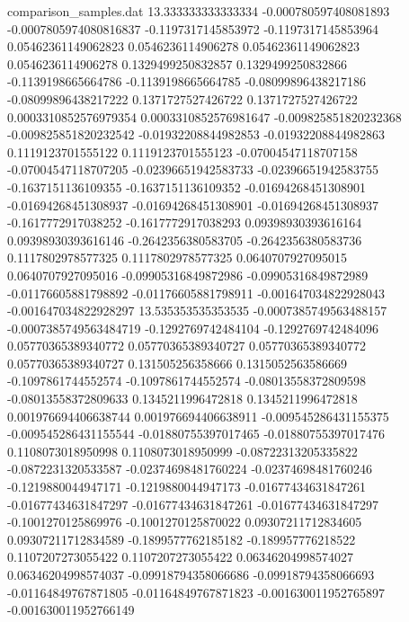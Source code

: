 \begin{filecontents}{comparison_samples.dat}
13.333333333333334  -0.000780597408081893   -0.0007805974080816837  -0.1197317145853972    -0.1197317145853964    0.05462361149062823    0.0546236114906278     0.05462361149062823    0.0546236114906278     0.1329499250832857     0.1329499250832866     -0.1139198665664786     -0.1139198665664785     -0.08099896438217186   -0.08099896438217222   0.1371727527426722      0.1371727527426722      0.0003310852576979354   0.0003310852576981647   -0.009825851820232368   -0.009825851820232542   -0.01932208844982853    -0.01932208844982863    0.1119123701555122      0.1119123701555123      -0.07004547118707158    -0.07004547118707205    -0.02396651942583733   -0.02396651942583755   -0.1637151136109355    -0.1637151136109352    -0.01694268451308901    -0.01694268451308937    -0.01694268451308901    -0.01694268451308937    -0.1617772917038252    -0.1617772917038293    0.09398930393616164     0.09398930393616146     -0.2642356380583705    -0.2642356380583736    0.1117802978577325      0.1117802978577325      0.0640707927095015      0.0640707927095016      -0.09905316849872986   -0.09905316849872989   -0.01176605881798892   -0.01176605881798911   -0.001647034822928043   -0.001647034822928297 
13.535353535353535  -0.0007385749563488157  -0.0007385749563484719  -0.1292769742484104    -0.1292769742484096    0.05770365389340772    0.05770365389340727    0.05770365389340772    0.05770365389340727    0.131505256358666      0.1315052563586669     -0.1097861744552574     -0.1097861744552574     -0.08013558372809598   -0.08013558372809633   0.1345211996472818      0.1345211996472818      0.001976694406638744    0.001976694406638911    -0.009545286431155375   -0.009545286431155544   -0.01880755397017465    -0.01880755397017476    0.1108073018950998      0.1108073018950999      -0.08722313205335822    -0.0872231320533587     -0.02374698481760224   -0.02374698481760246   -0.1219880044947171    -0.1219880044947173    -0.01677434631847261    -0.01677434631847297    -0.01677434631847261    -0.01677434631847297    -0.1001270125869976    -0.1001270125870022    0.09307211712834605     0.09307211712834589     -0.1899577762185182    -0.189957776218522     0.1107207273055422      0.1107207273055422      0.06346204998574027     0.06346204998574037     -0.09918794358066686   -0.09918794358066693   -0.01164849767871805   -0.01164849767871823   -0.001630011952765897   -0.001630011952766149 

\end{filecontents}
